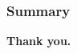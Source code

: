 \documentclass{beamer}
\begin{document}
% 
% 
% 
% 
% 


\begin{frame}
\frametitle{Summary}
\begin{center}
\large \bf Thank you.
\end{center}
\end{frame}
 
\end{document}
